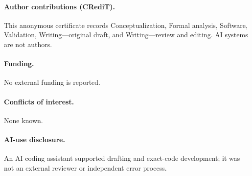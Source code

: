\documentclass[10pt]{article}
\begin{document}
\paragraph{Author contributions (CRediT).} This anonymous certificate records
Conceptualization, Formal analysis, Software, Validation, Writing---original
draft, and Writing---review and editing. AI systems are not authors.
\paragraph{Funding.} No external funding is reported.
\paragraph{Conflicts of interest.} None known.
\paragraph{AI-use disclosure.} An AI coding assistant supported drafting and
exact-code development; it was not an external reviewer or independent error
process.
\end{document}
